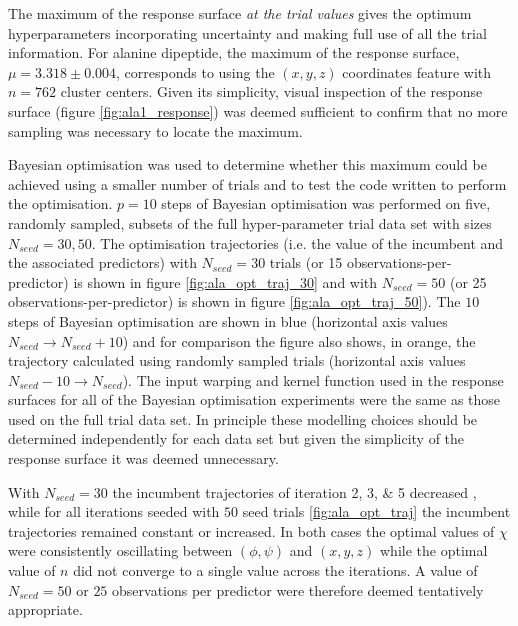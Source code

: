 The maximum of the response surface \emph{at the trial values} gives the optimum hyperparameters incorporating uncertainty and making full use of all the trial information. For alanine dipeptide, the maximum of the response surface, $\mu=\num{3.318}\pm\num{0.004}$, corresponds to using the $(x, y, z)$ coordinates feature with $n=762$ cluster centers. Given its simplicity, visual inspection of the response surface (figure \ref{fig:ala1_response}) was deemed sufficient to confirm that no more sampling was necessary to locate the maximum. 

Bayesian optimisation was used to determine whether this maximum could be achieved using a smaller number of trials and to test the code written to perform the optimisation. $p=10$ steps of Bayesian optimisation was performed on five, randomly sampled, subsets of the full hyper-parameter trial data set with sizes $N_{seed}=30,50$.  The optimisation trajectories (i.e. the value of the incumbent and the associated predictors)  with $N_{seed}=30$ trials (or 15 observations-per-predictor) is shown in figure \ref{fig:ala_opt_traj_30} and with $N_{seed}=50$ (or 25 observations-per-predictor) is shown in figure \ref{fig:ala_opt_traj_50}). The $10$ steps of Bayesian optimisation are shown in blue (horizontal axis values $N_{seed} \rightarrow N_{seed}+10$) and for comparison the figure also shows, in orange, the trajectory calculated using randomly sampled trials  (horizontal axis values $N_{seed}-10 \rightarrow N_{seed}$). The input warping  and kernel function used in the response surfaces for all of the Bayesian optimisation experiments were the same as those used on the full trial data set. In principle these modelling choices should be determined independently for each data set but given the simplicity of the response surface it was deemed unnecessary. 

With $N_{seed}=30$ the incumbent trajectories of iteration 2, 3, \& 5 decreased , while for all iterations seeded with $50$ seed trials \ref{fig:ala_opt_traj} the incumbent trajectories remained constant or increased. In both cases the optimal values of $\chi$ were consistently oscillating between $(\phi, \psi)$ and $(x, y, z)$ while the optimal value of $n$ did not converge to a single value across the iterations. A value of  $N_{seed} = 50$ or $25$ observations per predictor were therefore deemed tentatively appropriate. 

